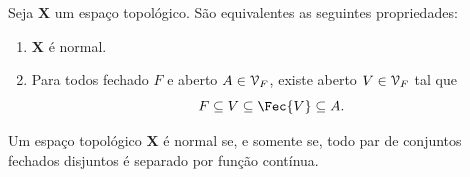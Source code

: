 \begin{prop}
Seja $\bm X$ um espaço topológico. São equivalentes as seguintes propriedades:
	\begin{enumerate}
	\item $\bm X$ é normal.
	\item Para todos fechado $F$ e aberto $A \in \mathcal{V}_F$, existe aberto $V \in \mathcal{V}_F$ tal que
		\begin{equation*}
		F \subseteq V \subseteq \Fec{V} \subseteq A.
		\end{equation*}
	\end{enumerate}
\end{prop}

\begin{prop}
Um espaço topológico $\bm X$ é normal se, e somente se, todo par de conjuntos fechados disjuntos é separado por função contínua.
\end{prop}
